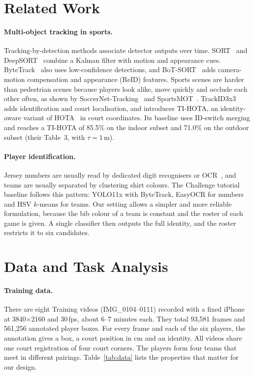 \documentclass[11pt,a4paper]{article}
\begin{document}
\section{Related Work}
\paragraph{Multi-object tracking in sports.}
Tracking-by-detection methods associate detector outputs over time. SORT~\cite{sort} and
DeepSORT~\cite{deepsort} combine a Kalman filter with motion and appearance cues. ByteTrack~\cite{bytetrack}
also uses low-confidence detections, and BoT-SORT~\cite{botsort} adds camera-motion compensation and
appearance (ReID) features. Sports scenes are harder than pedestrian scenes because players look alike,
move quickly and occlude each other often, as shown by SoccerNet-Tracking~\cite{soccernet} and
SportsMOT~\cite{sportsmot}. TrackID3x3~\cite{trackid3x3} adds identification and court localisation,
and introduces TI-HOTA, an identity-aware variant of HOTA~\cite{hota} in court coordinates. Its
baseline uses ID-switch merging and reaches a TI-HOTA of 85.5\% on the indoor subset and 71.0\% on the
outdoor subset (their Table~3, with $\tau = 1$\,m).

\paragraph{Player identification.}
Jersey numbers are usually read by dedicated digit recognisers or OCR~\cite{gerke}, and teams are
usually separated by clustering shirt colours. The Challenge tutorial baseline follows this pattern:
YOLO11x with ByteTrack, EasyOCR for numbers and HSV $k$-means for teams. Our setting allows a simpler and
more reliable formulation, because the bib colour of a team is constant and the roster of each game is
given. A single classifier then outputs the full identity, and the roster restricts it to six candidates.

\section{Data and Task Analysis}
\label{sec:data}
\paragraph{Training data.}
There are eight Training videos (IMG\_0104--0111) recorded with a fixed iPhone at 3840$\times$2160 and
30\,fps, about 6--7 minutes each. They total 93{,}581 frames and 561{,}256 annotated player boxes. For
every frame and each of the six players, the annotation gives a box, a court position in cm and an
identity. All videos share one court registration of four court corners. The players form four teams
that meet in different pairings. Table~\ref{tab:data} lists the properties that matter for our design.
\end{document}
